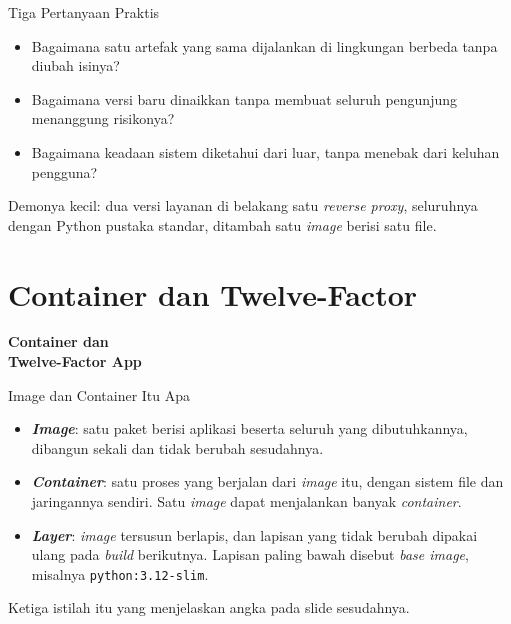 \documentclass[aspectratio=169, table, 12pt]{beamer}
\begin{document}
\begin{frame}{{\Large Tiga Pertanyaan Praktis}}
  \vspace{12pt}
  \begin{itemize}
    \item Bagaimana satu artefak yang sama dijalankan di lingkungan berbeda
          tanpa diubah isinya?
    \item Bagaimana versi baru dinaikkan tanpa membuat seluruh pengunjung
          menanggung risikonya?
    \item Bagaimana keadaan sistem diketahui dari luar, tanpa menebak dari
          keluhan pengguna?
  \end{itemize}
  \vspace{8pt}
  {\small Demonya kecil: dua versi layanan di belakang satu \textit{reverse
  proxy}, seluruhnya dengan Python pustaka standar, ditambah satu
  \textit{image} berisi satu file.}
\end{frame}

\section{Container dan Twelve-Factor}

\begin{frame}{\hfill}
  \centering
  \Huge{\textbf{Container dan\\Twelve-Factor App}}
\end{frame}

\begin{frame}{{\Large Image dan Container Itu Apa}}
  \vspace{10pt}
  \begin{itemize}
    \item \textbf{\textit{Image}}: satu paket berisi aplikasi beserta
          seluruh yang dibutuhkannya, dibangun sekali dan tidak berubah
          sesudahnya.
    \item \textbf{\textit{Container}}: satu proses yang berjalan dari
          \textit{image} itu, dengan sistem file dan jaringannya sendiri.
          Satu \textit{image} dapat menjalankan banyak \textit{container}.
    \item \textbf{\textit{Layer}}: \textit{image} tersusun berlapis, dan
          lapisan yang tidak berubah dipakai ulang pada \textit{build}
          berikutnya. Lapisan paling bawah disebut \textit{base image},
          misalnya \texttt{python:3.12-slim}.
  \end{itemize}
  \vspace{8pt}
  {\small Ketiga istilah itu yang menjelaskan angka pada slide sesudahnya.}
\end{frame}
\end{document}
